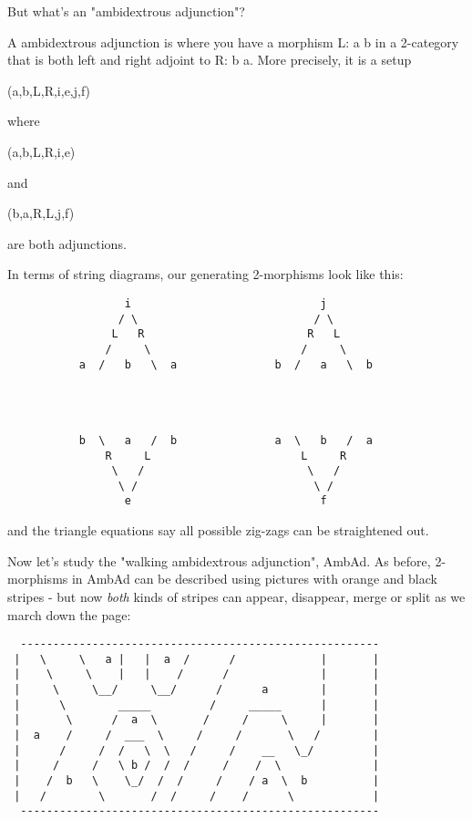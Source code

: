 But what's an "ambidextrous adjunction"?


 A ambidextrous adjunction is where you have a morphism
L: a \to  b
in a 2-category that is both left and right adjoint to 
R: b \to  a.
More precisely, it is a setup

(a,b,L,R,i,e,j,f) 

where 

(a,b,L,R,i,e) 

and

(b,a,R,L,j,f) 

are both adjunctions.  

In terms of string diagrams, our generating 2-morphisms look like this:



\begin{verbatim}
                  i                             j
                 / \                           / \
                L   R                         R   L
               /     \                       /     \
           a  /   b   \  a               b  /   a   \  b




           b  \   a   /  b               a  \   b   /  a
               R     L                       L     R
                \   /                         \   /
                 \ /                           \ /
                  e                             f
\end{verbatim}
    
and the triangle equations say all possible zig-zags can be straightened
out.

Now let's study the "walking ambidextrous adjunction",
AmbAd.  As before, 2-morphisms in AmbAd can be described using pictures
with orange and black stripes - but now \emph{both} kinds of stripes
can appear, disappear, merge or split as we march down the page:

\begin{verbatim}
  -------------------------------------------------------
 |   \     \   a |   |  a  /      /             |       |
 |    \     \    |   |    /      /              |       |
 |     \     \__/     \__/      /      a        |       |
 |      \        _____         /     _____      |       |
 |       \      /  a  \       /     /     \     |       |
 |  a    /     /  ___  \     /     /       \   /        |
 |      /     /  /   \  \   /     /    __   \_/         |
 |     /     /   \ b /  /  /     /    /  \              |
 |    /  b   \    \_/  /  /     /    / a  \  b          |
 |   /        \       /  /     /    /      \            |
  -------------------------------------------------------
\end{verbatim}
    
